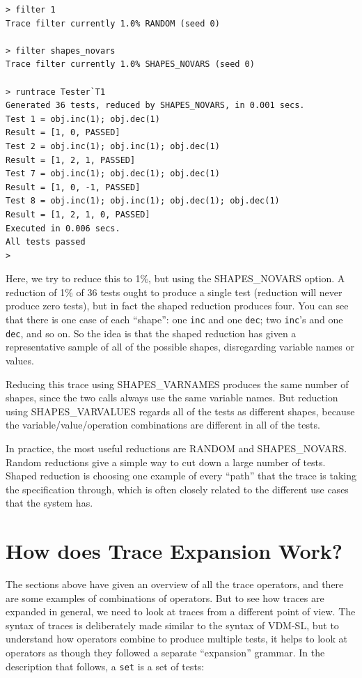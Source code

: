 \documentclass{overturerepchap}
\begin{document}
\lstset{style=tool,language=}
\begin{lstlisting}
> filter 1
Trace filter currently 1.0% RANDOM (seed 0)

> filter shapes_novars
Trace filter currently 1.0% SHAPES_NOVARS (seed 0)

> runtrace Tester`T1
Generated 36 tests, reduced by SHAPES_NOVARS, in 0.001 secs. 
Test 1 = obj.inc(1); obj.dec(1)
Result = [1, 0, PASSED]
Test 2 = obj.inc(1); obj.inc(1); obj.dec(1)
Result = [1, 2, 1, PASSED]
Test 7 = obj.inc(1); obj.dec(1); obj.dec(1)
Result = [1, 0, -1, PASSED]
Test 8 = obj.inc(1); obj.inc(1); obj.dec(1); obj.dec(1)
Result = [1, 2, 1, 0, PASSED]
Executed in 0.006 secs. 
All tests passed
>
\end{lstlisting}
\lstset{style=mystyle}
\lstset{language=VDM++}
\normalsize

\noindent Here, we try to reduce this to 1\%, but using the SHAPES\_NOVARS option. A
reduction of 1\% of 36 tests ought to produce a single test (reduction will
never produce zero tests), but in fact the shaped reduction produces four. You
can see that there is one case of each ``shape'': one \texttt{inc} and one \texttt{dec}; two \texttt{inc}'s
and one \texttt{dec}, and so on. So the idea is that the shaped reduction has given a
representative sample of all of the possible shapes, disregarding variable names
or values.

Reducing this trace using SHAPES\_VARNAMES produces the same number of shapes,
since the two calls always use the same variable names. But reduction using
SHAPES\_VARVALUES regards all of the tests as different shapes, because the
variable/value/operation combinations are different in all of the tests.

In practice, the most useful reductions are RANDOM and SHAPES\_NOVARS. Random
reductions give a simple way to cut down a large number of tests. Shaped
reduction is choosing one example of every ``path'' that the trace is taking the
specification through, which is often closely related to the different use cases
that the system has.


\section{How does Trace Expansion Work?}

The sections above have given an overview of all the trace operators, and there
are some examples of combinations of operators. But to see how traces are
expanded in general, we need to look at traces from a different point of view.
The syntax of traces is deliberately made similar to the syntax of VDM-SL, but
to understand how operators combine to produce multiple tests, it helps to look
at operators as though they followed a separate ``expansion'' grammar. In the
description that follows, a \texttt{set} is a set of tests:
\end{document}
